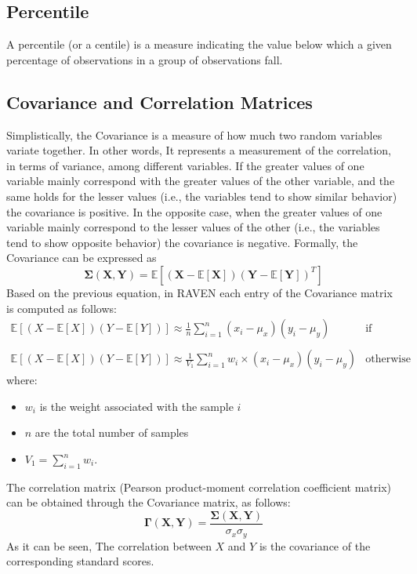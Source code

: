 \subsection{Percentile}
A percentile (or a centile) is a measure indicating the value below which a given percentage of observations in a group of observations fall.

\subsection{Covariance and Correlation Matrices}
Simplistically, the Covariance is a measure of how much two random variables variate together. In other words, It represents a
measurement of the correlation, in terms of variance,  among different variables. If the greater values of one variable mainly
correspond with the greater values of the other variable, and the same holds for the lesser values (i.e., the variables tend to show
similar behavior) the covariance is positive. In the opposite case, when the greater values of one variable mainly correspond to the
lesser values of the other (i.e., the variables tend to show opposite behavior) the covariance is negative.
Formally, the Covariance can be expressed as
\begin{equation}
 \boldsymbol{\Sigma}(\boldsymbol{X},\boldsymbol{Y})  = \mathbb{E} \left [ \left ( \boldsymbol{X}- \mathbb{E}\left [ \boldsymbol{X} \right ] \right ) \left ( \boldsymbol{Y}- \mathbb{E}\left [ \boldsymbol{Y} \right ] \right )^{T}\right ]
\end{equation}
Based on the previous equation, in RAVEN each entry of the Covariance matrix is computed as follows:
\begin{equation}
\begin{matrix}
 \mathbb{E} \left [ \left ( X- \mathbb{E}\left [ X \right ] \right ) \left ( Y- \mathbb{E}\left [ Y \right ] \right )\right ] \approx
 \frac{1}{n}\sum_{i=1}^{n} (x_{i} - \mu_{x})(y_{i} -  \mu_{y})  & \text{if random sampling}
\\
\\
 \mathbb{E} \left [ \left ( X- \mathbb{E}\left [ X \right ] \right ) \left ( Y- \mathbb{E}\left [ Y \right ] \right )\right ] \approx
\frac{1}{V_{1}} \sum_{i=1}^{n} w_{i} \times (x_{i} -  \mu_{x})(y_{i} -  \mu_{y}) &   \text{otherwise}
\end{matrix}
\end{equation}
where:
\begin{itemize}
  \item $w_{i}$ is the weight associated with the sample $i$
  \item $n$ are the total number of samples
  \item $V_{1} = \sum_{i=1}^{n} w_{i}$.
\end{itemize}
The correlation matrix (Pearson product-moment correlation coefficient matrix) can be obtained through the Covariance matrix, as follows:
\begin{equation}
\boldsymbol{\Gamma}(\boldsymbol{X},\boldsymbol{Y}) = \frac{\boldsymbol{\Sigma}(\boldsymbol{X},\boldsymbol{Y})}{\sigma_{x} \sigma_{y}}
\end{equation}
As it can be seen, The correlation between $X$ and $Y$ is the
covariance of the corresponding standard scores.

